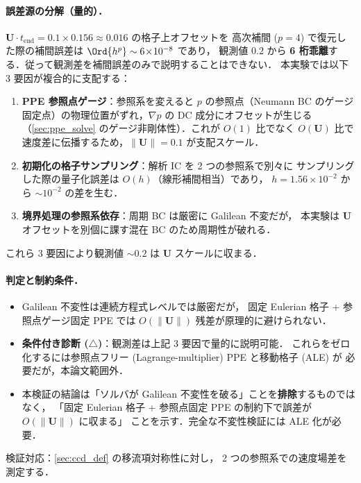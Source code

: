 \paragraph{誤差源の分解（量的）．}
$\bm U \cdot t_{\mathrm{end}} = 0.1 \times 0.156 \approx 0.016$ の格子上オフセットを
高次補間 ($p=4$) で復元した際の補間誤差は $\Ord{h^p} \sim 6\!\times\!10^{-8}$ であり，
観測値 $0.2$ から \textbf{6 桁乖離}する．従って観測差を補間誤差のみで説明することはできない．
本実験では以下 3 要因が複合的に支配する：
\begin{enumerate}\setlength{\itemsep}{0pt}
  \item \textbf{PPE 参照点ゲージ}：参照系を変えると $p$ の参照点（Neumann BC のゲージ
        固定点）の物理位置がずれ，$\nabla p$ の DC 成分にオフセットが生じる
        （\autoref{sec:ppe_solve} のゲージ非剛体性）．これが $O(1)$ 比でなく
        $O(\bm U)$ 比で速度差に伝播するため，$\|\bm U\| = 0.1$ が支配スケール．
  \item \textbf{初期化の格子サンプリング}：解析 IC を 2 つの参照系で別々に
        サンプリングした際の量子化誤差は $O(h)$（線形補間相当）であり，
        $h=1.56\!\times\!10^{-2}$ から $\sim 10^{-2}$ の差を生む．
  \item \textbf{境界処理の参照系依存}：周期 BC は厳密に Galilean 不変だが，
        本実験は $\bm U$ オフセットを別個に課す混在 BC のため周期性が破れる．
\end{enumerate}
これら 3 要因により観測値 $\sim 0.2$ は $\bm U$ スケールに収まる．

\paragraph{判定と制約条件．}
\begin{itemize}\setlength{\itemsep}{0pt}
  \item Galilean 不変性は連続方程式レベルでは厳密だが，
        固定 Eulerian 格子 + 参照点ゲージ固定 PPE では $O(\|\bm U\|)$ 残差が原理的に避けられない．
  \item \textbf{条件付き診断 ($\triangle$)}：観測差は上記 3 要因で量的に説明可能．
        これらをゼロ化するには参照点フリー (Lagrange-multiplier) PPE と移動格子 (ALE) が
        必要だが，本論文範囲外．
  \item 本検証の結論は「ソルバが Galilean 不変性を破る」ことを\textbf{排除}するものではなく，
        「固定 Eulerian 格子 + 参照点固定 PPE の制約下で誤差が $O(\|\bm U\|)$ に収まる」
        ことを示す．完全な不変性検証には ALE 化が必要．
\end{itemize}
検証対応：\autoref{sec:ccd_def} の移流項対称性に対し，
2 つの参照系での速度場差を測定する．

